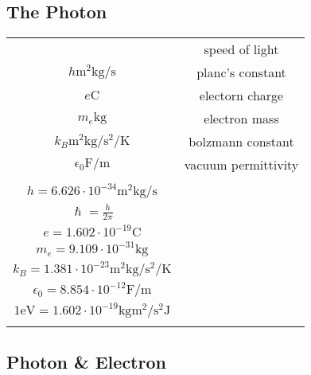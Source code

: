 \documentclass{article}
\begin{document}
\begin{twocolumn} 



\section{The Photon}  

\begin{donotbrake}
\begin{tabular}{cc}
	\begin{dtabular}
		
		$c \si{\metre \per \second}$ & speed of light \\
		$h \si{\metre \squared \kilogram \per \second}$ & planc's constant \\
		$e \si{\coulomb}$ & electorn charge \\
		$m_e \si{\kilogram}$ & electron mass \\
		$k_B \si{\metre \squared \kilogram \per \second \squared \per \kelvin}$ & bolzmann constant \\
		$\epsilon_0 \si{\farad \per \metre}$ & vacuum permittivity \\
		
	\end{dtabular}

	\begin{mtabular}{c}
		$c = 2.998 \cdot 10^8 \si{\metre \per \second}$ \\
		$h = 6.626 \cdot 10^{-34} \si{\metre \squared \kilogram \per \second}$ \\
		$\hslash = \frac{h}{2\pi}$ \\
		$e = 1.602 \cdot 10^{-19} \si{\coulomb}$ \\
		$m_e = 9.109 \cdot 10^{-31} \si{\kilogram}$ \\
		$k_B = 1.381 \cdot 10^{-23} \si{\metre \squared \kilogram \per \second \squared \per \kelvin}$ \\
		$\epsilon_0 = 8.854 \cdot 10^{-12} \si{\farad \per \meter}$ \\
		$1 \si{\electronvolt} = 1.602 \cdot 10^{-19} \si{\kilogram \metre \squared \per \second \squared} \si{\joule}$ \\
	\end{mtabular} 
\end{tabular}
\end{donotbrake}

\begin{donotbrake}
\subsection{Photon \& Electron}


\end{donotbrake}
\end{twocolumn}
\end{document}
